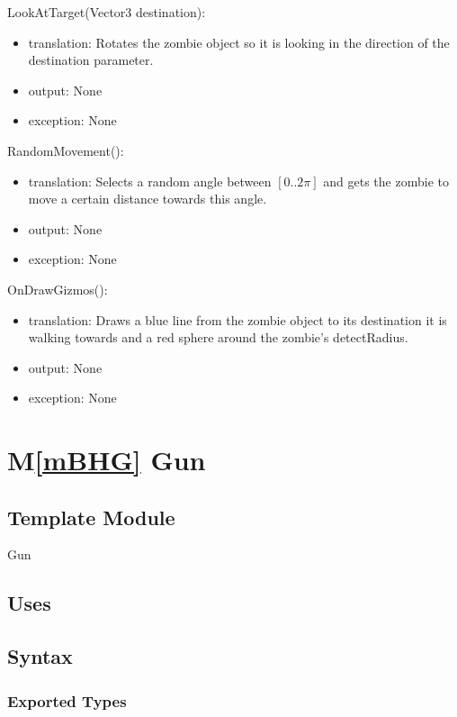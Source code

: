 \documentclass[12pt]{article}
\newcommand{\mref}[1]{M\ref{#1}}
\begin{document}
\noindent LookAtTarget(Vector3 destination):
\begin{itemize}
\item translation: Rotates the zombie object so it is looking in the direction of the destination parameter.
\item output: None
\item exception: None
\end{itemize}

\noindent RandomMovement():
\begin{itemize}
\item translation: Selects a random angle between $[0..2\pi]$ and gets the zombie to move a certain distance towards this angle.
\item output: None
\item exception: None
\end{itemize}

\noindent OnDrawGizmos():
\begin{itemize}
\item translation: Draws a blue line from the zombie object to its destination it is walking towards and a red sphere around the zombie's detectRadius.
\item output: None
\item exception: None
\end{itemize}


\newpage
\section*{\mref{mBHG} Gun}

\subsection*{Template Module}

Gun

\subsection* {Uses}


\subsection* {Syntax}

\subsubsection* {Exported Types}
\end{document}
